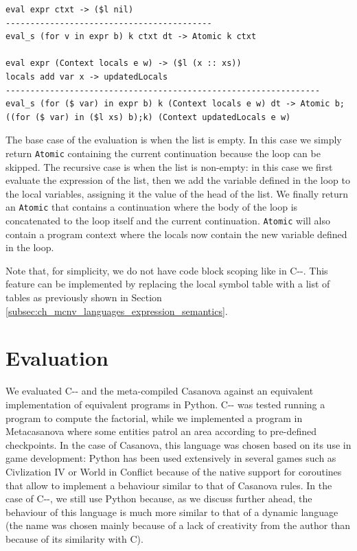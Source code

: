 \begin{lstlisting}
eval expr ctxt -> ($l nil)
------------------------------------------
eval_s (for v in expr b) k ctxt dt -> Atomic k ctxt

eval expr (Context locals e w) -> ($l (x :: xs))
locals add var x -> updatedLocals
----------------------------------------------------------------
eval_s (for ($ var) in expr b) k (Context locals e w) dt -> Atomic b;((for ($ var) in ($l xs) b);k) (Context updatedLocals e w)
\end{lstlisting}

\noindent
The base case of the evaluation is when the list is empty. In this case we simply return \texttt{Atomic} containing the current continuation because the loop can be skipped. The recursive case is when the list is non-empty: in this case we first evaluate the expression of the list, then we add the variable defined in the loop to the local variables, assigning it the value of the head of the list. We finally return an \texttt{Atomic} that contains a continuation where the body of the loop is concatenated to the loop itself and the current continuation. \texttt{Atomic} will also contain a program context where the locals now contain the new variable defined in the loop.

Note that, for simplicity, we do not have code block scoping like in C-{}-. This feature can be implemented by replacing the local symbol table with a list of tables as previously shown in Section \ref{subsec:ch_mcnv_languages_expression_semantics}.

\section{Evaluation}
We evaluated C-{}- and the meta-compiled Casanova against an equivalent implementation of equivalent programs in Python. C-{}- was tested running a program to compute the factorial, while we implemented a program in Metacasanova where some entities patrol an area according to pre-defined checkpoints. In the case of Casanova, this language was chosen based on its use in game development: Python has been used extensively in several games such as Civlization IV \cite{CIV4} or World in Conflict \cite{WIC} because of the native support for coroutines that allow to implement a behaviour similar to that of Casanova rules. In the case of C-{}-, we still use Python because, as we discuss further ahead, the behaviour of this language is much more similar to that of a dynamic language (the name was chosen mainly because of a lack of creativity from the author than because of its similarity with C).


